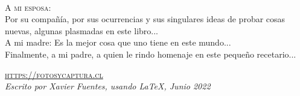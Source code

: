 ~\vfill
\thispagestyle{empty}

\noindent \textsc{A mi esposa:}\\

\noindent Por su compañía, por sus ocurrencias y sus singulares ideas de probar cosas nuevas, algunas plasmadas en este libro...\\

\noindent A mi madre: Es la mejor cosa que uno tiene en este mundo...\\ 

\noindent Finalmente, a mi padre, a quien le rindo homenaje en este pequeño recetario...

\noindent \textsc{\url{https://fotosycaptura.cl}}\\ %

\noindent \textit{Escrito por Xavier Fuentes, usando \LaTeX, Junio 2022}